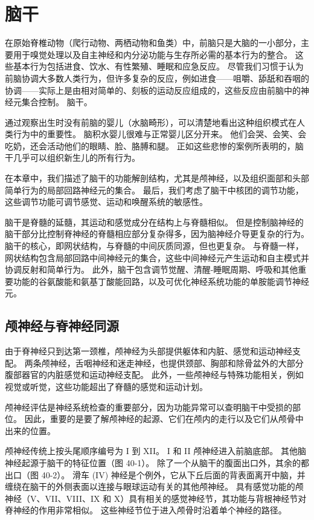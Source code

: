 \chapter{脑干}
在原始脊椎动物（爬行动物、两栖动物和鱼类）中，前脑只是大脑的一小部分，主要用于嗅觉处理以及自主神经和内分泌功能与生存所必需的基本行为的整合。 这些基本行为包括进食、饮水、有性繁殖、睡眠和应急反应。 尽管我们习惯于认为前脑协调大多数人类行为，但许多复杂的反应，例如进食——咀嚼、舔舐和吞咽的协调——实际上是由相对简单的、刻板的运动反应组成的，这些反应由前脑中的神经元集合控制。 脑干。

通过观察出生时没有前脑的婴儿（水脑畸形），可以清楚地看出这种组织模式在人类行为中的重要性。 脑积水婴儿很难与正常婴儿区分开来。 他们会哭、会笑、会吃奶，还会活动他们的眼睛、脸、胳膊和腿。 正如这些悲惨的案例所表明的，脑干几乎可以组织新生儿的所有行为。

在本章中，我们描述了脑干的功能解剖结构，尤其是颅神经，以及组织面部和头部简单行为的局部回路神经元的集合。 最后，我们考虑了脑干中核团的调节功能，这些调节功能可调节感觉、运动和唤醒系统的敏感性。

脑干是脊髓的延髓，其运动和感觉成分在结构上与脊髓相似。 但是控制脑神经的脑干部分比控制脊神经的脊髓相应部分复杂得多，因为脑神经介导更复杂的行为。 脑干的核心，即网状结构，与脊髓的中间灰质同源，但也更复杂。 与脊髓一样，网状结构包含局部回路中间神经元的集合，这些中间神经元产生运动和自主模式并协调反射和简单行为。 此外，脑干包含调节觉醒、清醒-睡眠周期、呼吸和其他重要功能的谷氨酸能和氨基丁酸能回路，以及可优化神经系统功能的单胺能调节神经元。

\section{颅神经与脊神经同源}
由于脊神经只到达第一颈椎，颅神经为头部提供躯体和内脏、感觉和运动神经支配。 两条颅神经，舌咽神经和迷走神经，也提供颈部、胸部和除骨盆外的大部分腹部器官的内脏感觉和运动神经支配。 此外，一些颅神经与特殊功能相关，例如视觉或听觉，这些功能超出了脊髓的感觉和运动计划。

颅神经评估是神经系统检查的重要部分，因为功能异常可以查明脑干中受损的部位。 因此，重要的是要了解颅神经的起源、它们在颅内的走行以及它们从颅骨中出来的位置。

颅神经传统上按头尾顺序编号为 I 到 XII。 I 和 II 颅神经进入前脑底部。 其他脑神经起源于脑干的特征位置（图 40-1）。 除了一个从脑干的腹面出口外，其余的都出口（图 40-2）。 滑车 (IV) 神经是个例外，它从下丘后面的背表面离开中脑，并缠绕在脑干的外侧表面以连接与眼球运动有关的其他颅神经。 具有感觉功能的颅神经（V、VII、VIII、IX 和 X）具有相关的感觉神经节，其功能与背根神经节对脊神经的作用非常相似。 这些神经节位于进入颅骨时沿着单个神经的路径。

